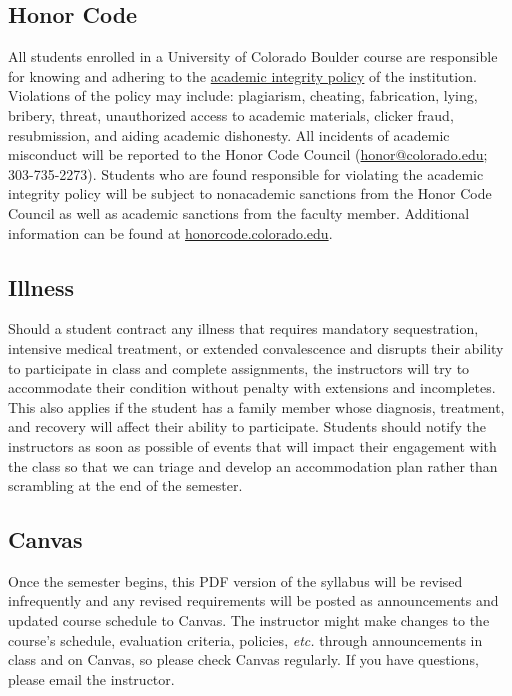 \documentclass[10pt]{memoir}
\begin{document}
\subsection{Honor Code}
All students enrolled in a University of Colorado Boulder course are responsible for knowing and adhering to the \href{http://www.colorado.edu/policies/academic-integrity-policy}{academic integrity policy} of the institution. Violations of the policy may include: plagiarism, cheating, fabrication, lying, bribery, threat, unauthorized access to academic materials, clicker fraud, resubmission, and aiding academic dishonesty. All incidents of academic misconduct will be reported to the Honor Code Council (\href{mailto:honor@colorado.edu}{honor@colorado.edu}; 303-735-2273). Students who are found responsible for violating the academic integrity policy will be subject to nonacademic sanctions from the Honor Code Council as well as academic sanctions from the faculty member. Additional information can be found at \href{http://honorcode.colorado.edu}{honorcode.colorado.edu}. 

\subsection{Illness}
Should a student contract any illness that requires mandatory sequestration, intensive medical treatment, or extended convalescence and disrupts their ability to participate in class and complete assignments, the instructors will try to accommodate their condition without penalty with extensions and incompletes. This also applies if the student has a family member whose diagnosis, treatment, and recovery will affect their ability to participate. Students should notify the instructors as soon as possible of events that will impact their engagement with the class so that we can triage and develop an accommodation plan rather than scrambling at the end of the semester.

\subsection{Canvas}
Once the semester begins, this PDF version of the syllabus will be revised infrequently and any revised requirements will be posted as announcements and updated course schedule to Canvas. The instructor might make changes to the course's schedule, evaluation criteria, policies, \textit{etc.} through announcements in class and on Canvas, so please check Canvas regularly. If you have questions, please email the instructor.
\end{document}
